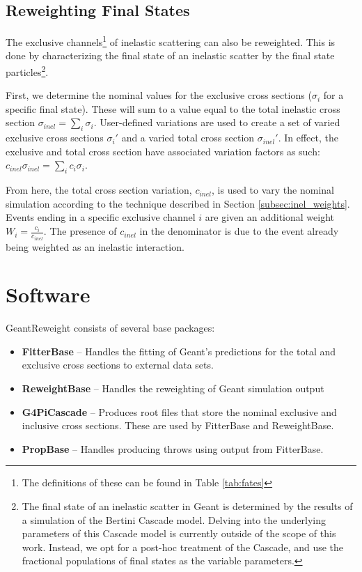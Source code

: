 \documentclass[12pt]{article}
\begin{document}
\subsection{Reweighting Final States}
The exclusive channels\footnote{The definitions of these can be found in Table \ref{tab:fates}} of inelastic scattering can also be reweighted. This is done by characterizing the final state of an inelastic scatter by the final state particles\footnote{The final state of an inelastic scatter in Geant is determined by the results of a simulation of the Bertini Cascade model. Delving into the underlying parameters of this Cascade model is currently outside of the scope of this work. Instead, we opt for a post-hoc treatment of the Cascade, and use the fractional populations of final states as the variable parameters.}. 

First, we determine the nominal values for the exclusive cross sections ($\sigma_{i}$ for a specific final state). These will sum to a value equal to the total inelastic cross section $\sigma_{inel} = \sum\limits_{i}\sigma_{i}$. User-defined variations are used to create a set of varied exclusive cross sections $\sigma_{i}'$ and a varied total cross section $\sigma_{inel}'$. In effect, the exclusive and total cross section have associated variation factors as such: $c_{inel}\sigma_{inel}  = \sum\limits_{i} c_{i} \sigma_{i}$. 

From here, the total cross section variation, $c_{inel}$, is used to vary the nominal simulation according to the technique described in Section \ref{subsec:inel_weights}. Events ending in a specific exclusive channel $i$ are given an additional weight $W_{i} = \frac{c_i}{c_{inel}}$. The presence of $c_{inel}$ in the denominator is due to the event already being weighted as an inelastic interaction. 


\section{Software}
GeantReweight consists of several base packages:
\begin{itemize}
	\item \textbf{FitterBase} -- Handles the fitting of Geant's predictions for the total and exclusive cross sections to external data sets.
	\item \textbf{ReweightBase} -- Handles the reweighting of Geant simulation output
	\item \textbf{G4PiCascade} -- Produces root files that store the nominal exclusive and inclusive cross sections. These are used by FitterBase and ReweightBase. 
	\item \textbf{PropBase} -- Handles producing throws using output from FitterBase.
\end{itemize}
\end{document}
